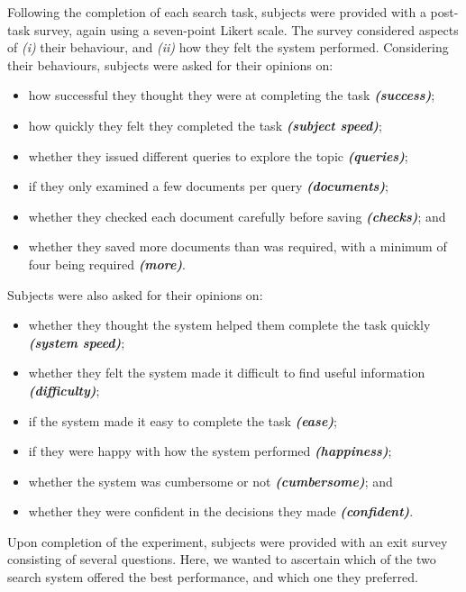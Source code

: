 Following the completion of each search task, subjects were provided with a post-task survey, again using a seven-point Likert scale. The survey considered aspects of \emph{(i)} their behaviour, and \emph{(ii)} how they felt the system performed. Considering their behaviours, subjects were asked for their opinions on:
\begin{itemize}
\item how successful they thought they were at completing the task \emph{\textbf{(success)}}; 
\item how quickly they felt they completed the task \emph{\textbf{(subject speed)}}; 
\item whether they issued different queries to explore the topic \emph{\textbf{(queries)}}; 
\item if they only examined a few documents per query \emph{\textbf{(documents)}}; 
\item whether they checked each document carefully before saving \emph{\textbf{(checks)}}; and 
\item whether they saved more documents than was required, with a minimum of four being required \emph{\textbf{(more)}}. 
\end{itemize}
Subjects were also asked for their opinions on: 
\begin{itemize}
\item whether they thought the system helped them complete the task quickly \emph{\textbf{(system speed)}}; 
\item whether they felt the system made it difficult to find useful information \emph{\textbf{(difficulty)}}; 
\item if the system made it easy to complete the task \emph{\textbf{(ease)}}; 
\item if they were happy with how the system performed \emph{\textbf{(happiness)}}; 
\item whether the system was cumbersome or not \emph{\textbf{(cumbersome)}}; and 
\item whether they were confident in the decisions they made \emph{\textbf{(confident)}}. 
\end{itemize}
Upon completion of the experiment, subjects were provided with an exit survey consisting of several questions. Here, we wanted to ascertain which of the two search system offered the best performance, and which one they preferred. 


